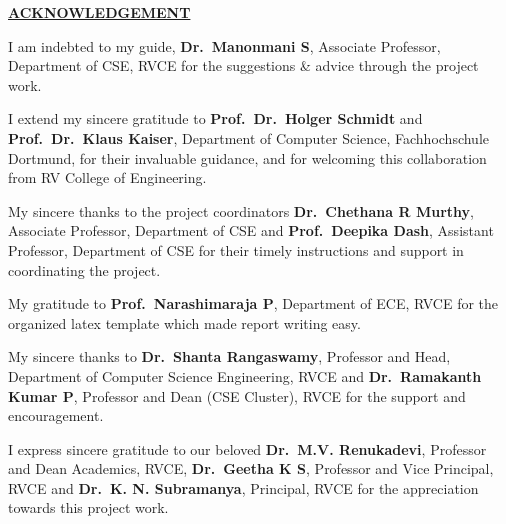 \thispagestyle{empty}
\ifIDP \vspace{-1cm}\fi
\begin{center}
	\Large\textbf{\underline{ACKNOWLEDGEMENT}} \par
\end{center}

\vspace{0.2cm}

\begingroup
\setlength{\parskip}{0.5\baselineskip}

I am indebted to my guide, \textbf{Dr.~Manonmani S}, Associate Professor, Department of CSE, RVCE for the suggestions \& advice through the project work.\par

I extend my sincere gratitude to \textbf{Prof.~Dr.~Holger Schmidt} and \textbf{Prof.~Dr.~Klaus Kaiser}, Department of Computer Science, Fachhochschule Dortmund, for their invaluable guidance, and for welcoming this collaboration from RV College of Engineering.\par

My sincere thanks to the project coordinators \textbf{Dr.~Chethana R Murthy}, Associate Professor, Department of CSE and \textbf{Prof.~Deepika Dash}, Assistant Professor, Department of CSE for their timely instructions and support in coordinating the project.\par

My gratitude to \textbf{Prof.~Narashimaraja P}, Department of ECE, RVCE for the organized latex template which made report writing easy.\par

My sincere thanks to \textbf{Dr.~Shanta Rangaswamy}, Professor and Head, Department of Computer Science Engineering, RVCE and \textbf{Dr.~Ramakanth Kumar P}, Professor and Dean (CSE Cluster), RVCE for the support and encouragement.\par

I express sincere gratitude to our beloved \textbf{Dr.~M.V. Renukadevi}, Professor and Dean Academics, RVCE, \textbf{Dr.~Geetha K S}, Professor and Vice Principal, RVCE and \textbf{Dr.~K. N. Subramanya}, Principal, RVCE for the appreciation towards this project work.\par

